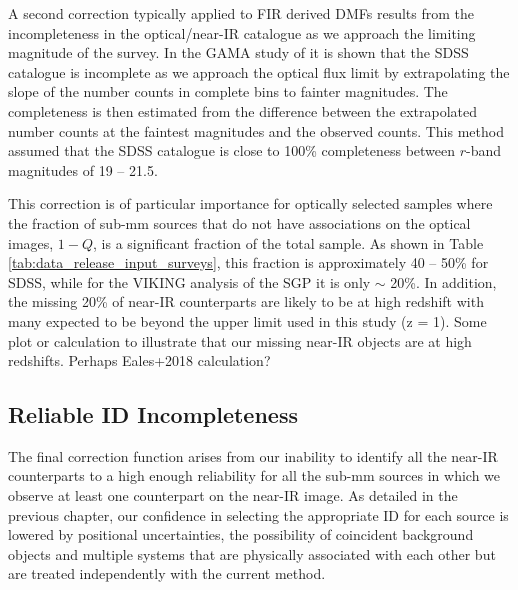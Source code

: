 A second correction typically applied to FIR derived DMFs results from the incompleteness in the optical/near-IR catalogue as we approach the limiting magnitude of the survey. In the GAMA study of \citealt{Dunne_2011} it is shown that the SDSS catalogue is incomplete as we approach the optical flux limit by extrapolating the slope of the number counts in complete bins to fainter magnitudes. The completeness is then estimated from the difference between the extrapolated number counts at the faintest magnitudes and the observed counts. This method assumed that the SDSS catalogue is close to 100\% completeness between $r$-band magnitudes of 19 -- 21.5. 

This correction is of particular importance for optically selected samples where the fraction of sub-mm sources that do not have associations on the optical images, $1 - Q$, is a significant fraction of the total sample. As shown in Table \ref{tab:data_release_input_surveys}, this fraction is approximately 40 -- 50\% for SDSS, while for the VIKING analysis of the SGP it is only $\sim$ 20\%. In addition, the missing 20\% of near-IR counterparts are likely to be at high redshift with many expected to be beyond the upper limit used in this study (z = 1). {\color{red} Some plot or calculation to illustrate that our missing near-IR objects are at high redshifts. Perhaps Eales+2018 calculation?}

\subsection{Reliable ID Incompleteness}

The final correction function arises from our inability to identify all the near-IR counterparts to a high enough reliability for all the sub-mm sources in which we observe at least one counterpart on the near-IR image. As detailed in the previous chapter, our confidence in selecting the appropriate ID for each source is lowered by positional uncertainties, the possibility of coincident background objects and multiple systems that are physically associated with each other but are treated independently with the current method.

